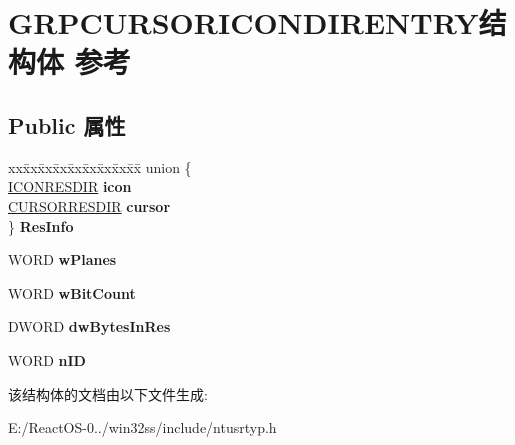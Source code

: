 \hypertarget{struct_g_r_p_c_u_r_s_o_r_i_c_o_n_d_i_r_e_n_t_r_y}{}\section{G\+R\+P\+C\+U\+R\+S\+O\+R\+I\+C\+O\+N\+D\+I\+R\+E\+N\+T\+R\+Y结构体 参考}
\label{struct_g_r_p_c_u_r_s_o_r_i_c_o_n_d_i_r_e_n_t_r_y}
\subsection*{Public 属性}
\begin{DoxyCompactItemize}
\item 
\mbox{\label{struct_g_r_p_c_u_r_s_o_r_i_c_o_n_d_i_r_e_n_t_r_y_aafdf6973fbe89602aa1c3f6a14f7b145}} 
\begin{tabbing}
xx\=xx\=xx\=xx\=xx\=xx\=xx\=xx\=xx\=\kill
union \{\\
\>\hyperlink{struct_i_c_o_n_r_e_s_d_i_r}{ICONRESDIR} {\bfseries icon}\\
\>\hyperlink{struct_c_u_r_s_o_r_r_e_s_d_i_r}{CURSORRESDIR} {\bfseries cursor}\\
\} {\bfseries ResInfo}\\

\end{tabbing}\item 
\mbox{\label{struct_g_r_p_c_u_r_s_o_r_i_c_o_n_d_i_r_e_n_t_r_y_a226ae41a39f26f4d4b3b9e78a4283852}} 
W\+O\+RD {\bfseries w\+Planes}
\item 
\mbox{\label{struct_g_r_p_c_u_r_s_o_r_i_c_o_n_d_i_r_e_n_t_r_y_a385da82dd6cfa9a3496f448f41085fb9}} 
W\+O\+RD {\bfseries w\+Bit\+Count}
\item 
\mbox{\label{struct_g_r_p_c_u_r_s_o_r_i_c_o_n_d_i_r_e_n_t_r_y_a52b7cea0bb457d4e1f3dfdaf3bbe7171}} 
D\+W\+O\+RD {\bfseries dw\+Bytes\+In\+Res}
\item 
\mbox{\label{struct_g_r_p_c_u_r_s_o_r_i_c_o_n_d_i_r_e_n_t_r_y_a04ccd7dcd79ab7095b6c0ae4e0b0cc9e}} 
W\+O\+RD {\bfseries n\+ID}
\end{DoxyCompactItemize}


该结构体的文档由以下文件生成\+:\begin{DoxyCompactItemize}
\item 
E\+:/\+React\+O\+S-\/0../win32ss/include/ntusrtyp.\+h\end{DoxyCompactItemize}

